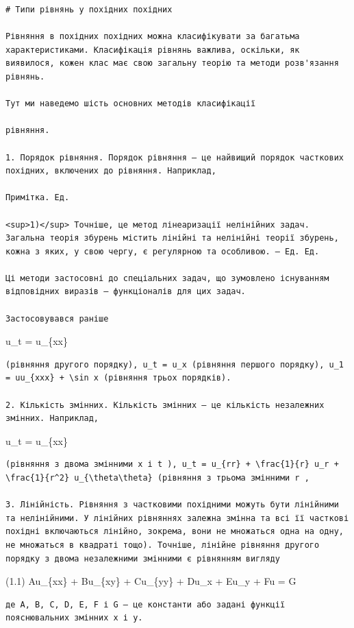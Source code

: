 \documentclass[
  ukrainian,
]{article}
\begin{document}
\begin{verbatim}
# Типи рівнянь у похідних похідних

Рівняння в похідних похідних можна класифікувати за багатьма характеристиками. Класифікація рівнянь важлива, оскільки, як виявилося, кожен клас має свою загальну теорію та методи розв'язання рівнянь.

Тут ми наведемо шість основних методів класифікації

рівняння.

1. Порядок рівняння. Порядок рівняння — це найвищий порядок часткових похідних, включених до рівняння. Наприклад,

Примітка. Ед.

<sup>1)</sup> Точніше, це метод лінеаризації нелінійних задач. Загальна теорія збурень містить лінійні та нелінійні теорії збурень, кожна з яких, у свою чергу, є регулярною та особливою. — Ед. Ед.

Ці методи застосовні до спеціальних задач, що зумовлено існуванням відповідних виразів — функціоналів для цих задач.

Застосовувався раніше
\end{verbatim}

u\_t = u\_\{xx\}

\begin{verbatim}
(рівняння другого порядку), u_t = u_x (рівняння першого порядку), u_1 = uu_{xxx} + \sin x (рівняння трьох порядків).

2. Кількість змінних. Кількість змінних — це кількість незалежних змінних. Наприклад,
\end{verbatim}

u\_t = u\_\{xx\}

\begin{verbatim}
(рівняння з двома змінними x і t ), u_t = u_{rr} + \frac{1}{r} u_r + \frac{1}{r^2} u_{\theta\theta} (рівняння з трьома змінними r ,

3. Лінійність. Рівняння з частковими похідними можуть бути лінійними та нелінійними. У лінійних рівняннях залежна змінна та всі її часткові похідні включаються лінійно, зокрема, вони не множаться одна на одну, не множаться в квадраті тощо). Точніше, лінійне рівняння другого порядку з двома незалежними змінними є рівнянням вигляду
\end{verbatim}

(1.1) Au\_\{xx\} + Bu\_\{xy\} + Cu\_\{yy\} + Du\_x + Eu\_y + Fu = G

\begin{verbatim}
де A, B, C, D, E, F і G — це константи або задані функції пояснювальних змінних x і y.
\end{verbatim}
\end{document}
